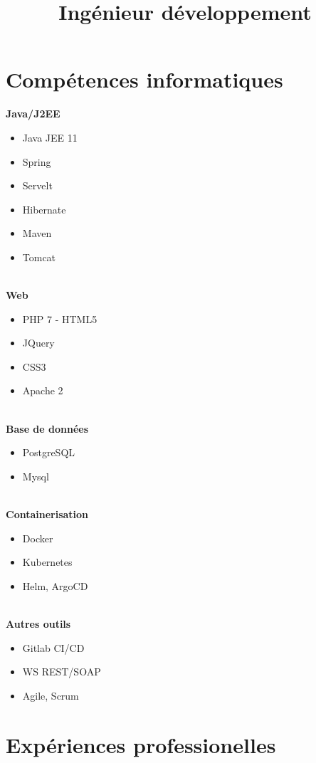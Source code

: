 \documentclass[10pt,a4paper,roman,french]{moderncv}        %
\title{Ingénieur développement}                               %
\begin{document}
\vspace*{-15mm}
\makecvtitle
\vspace*{-10mm}
\section{Compétences informatiques}
\begin{multicols}{2}
\textbf{Java/J2EE} 
\begin{itemize} 
	\item Java JEE 11
	\item Spring
	\item Servelt
	\item Hibernate
	\item Maven
	\item Tomcat
\end{itemize}
\textbf{\\Web} 
\begin{itemize} 
	\item PHP 7 - HTML5
	\item JQuery
	\item CSS3
	\item Apache 2
\end{itemize}
\textbf{\\Base de données} 
\begin{itemize} 
	\item PostgreSQL
	\item Mysql
\end{itemize}
\textbf{\\Containerisation}
\begin{itemize} 
	\item Docker
	\item Kubernetes
	\item Helm, ArgoCD
	
\end{itemize}

\textbf{\\Autres outils} 
\begin{itemize} 
	\item Gitlab CI/CD
	\item WS REST/SOAP
	\item Agile, Scrum
\end{itemize}
\end{multicols}

\section{Expériences professionelles}
\end{document}

